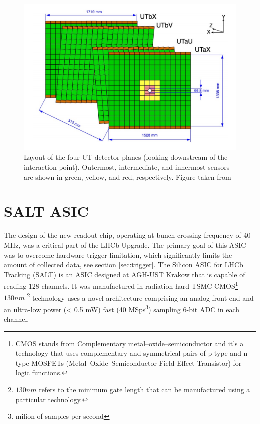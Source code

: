  
 \begin{figure}[!h]
\centering
\includegraphics{figures/UT.png}
\caption{Layout of the four UT detector planes (looking downstream of the interaction point). Outermost, intermediate, and innermost sensors are shown in green, yellow, and red, respectively. Figure taken from \cite{upgrade_tracker_tdr}
\label{fig:UT_scheme}}
\end{figure}

 
 
 
 \section{SALT ASIC}
 \label{sec:salt}
The design of the new readout chip, operating at bunch crossing frequency of 40 MHz, was a critical part of the LHCb Upgrade. The primary goal of this ASIC was to overcome hardware trigger limitation, which significantly limits the amount of collected data, see section \ref{sec:trigger}. 
The Silicon ASIC for LHCb Tracking (SALT) is an ASIC designed at AGH-UST Krakow that is capable of reading 128-channels. It was manufactured in radiation-hard TSMC CMOS\footnote{CMOS stands from Complementary metal–oxide–semiconductor and it's a technology that uses complementary and symmetrical pairs of p-type and n-type  MOSFETs (Metal–Oxide–Semiconductor Field-Effect Transistor) for logic functions.} $130 nm$ \footnote{$130 nm$ refers to the minimum gate length that can be manufactured using a particular technology. } technology uses a novel architecture comprising an analog front-end and an ultra-low power (< 0.5 mW) fast (40 MSps\footnote{milion of samples per second}) sampling 6-bit ADC in each channel. 


